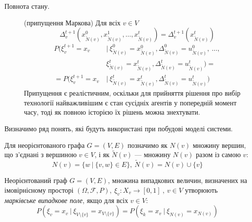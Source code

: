 \documentclass[oneside,draft,14pt]{extarticle}
\begin{document}
\begin{description}
	\item[Повнота стану.] (припущення Маркова) Для всіх \(v \in V\)
	\[\Delta_v^{t+1}(x_{\tilde{N}(v)}^0, x_{\tilde{N}(v)}^1, \ldots, x_{\tilde{N}(v)}^t) = \Delta_v^{t+1}(x_{\tilde{N}(v)}^t)\]
	\begin{align*}
	P(\xi_v^{t+1} = x_v\ &|\ \xi_{\tilde N(v)}^0 = x_{\tilde N(v)}^0, \Delta_{\tilde N(v)}^0 = u_{\tilde N(v)}^0,\ \ldots,\\ &\xi_{\tilde N(v)}^t = x_{\tilde N(v)}^t, \Delta_{\tilde N(v)}^t = u_{\tilde N(v)}^t) = \\
	= P(\xi_v^{t+1} = x_v\ & |\ \xi_{\tilde N(v)}^t = x_{\tilde N(v)}^t, \Delta_{\tilde N(v)}^t = u_{\tilde N(v)}^t)
	\end{align*}
	Припущення є реалістичним, оскільки для прийняття рішення про вибір технології найважливішим є стан сусідніх агентів у попередній момент часу, тоді як повною історією їх рішень можна знехтувати.

\end{description}







Визначимо ряд понять, які будуть використані при побудові моделі системи.

Для неорієнтованого графа \(G = (V, E)\) позначимо як \(N(v)\) множину вершин, що з’єднані з вершиною \(v \in V\), і як \(\tilde{N}(v)\) — множину \(N(v)\) разом із самою \(v\):
\[N(v) = \{w\ |\ \{v, w\} \in E\},\ \tilde{N}(v) = N(v) \cup \{v\}\]

\begin{definition}
Неорієнтований граф \(G = (V, E)\), множина випадкових величин, визначених на імовірнісному просторі \((\Omega, \mathcal{F}, P),\ \xi_v : X_v \rightarrow [0, 1]\ ,\ v \in V\) утворюють \textit{марківське випадкове поле}, якщо для всіх \(v \in V\):
\[P(\xi_v = x_v\ |\ \xi_{V\setminus\{v\}} = x_{V\setminus\{v\}}) = P(\xi_k = x_v\ |\ \xi_{N(v)} = x_{N(v)})\]
\end{definition}
\end{document}
